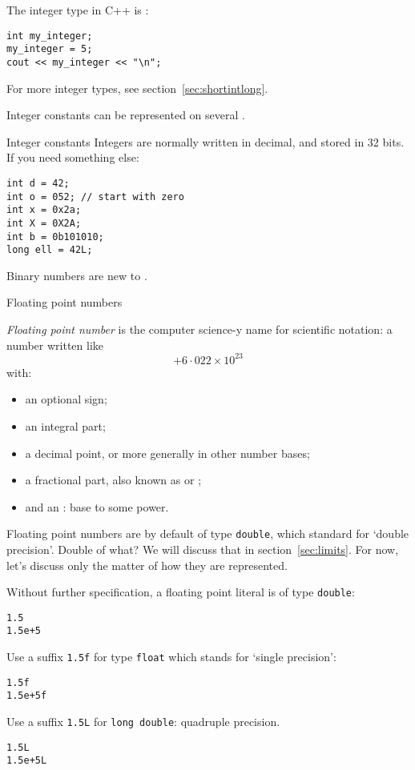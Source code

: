 The integer type in C++ is :
\begin{lstlisting}
int my_integer;
my_integer = 5;
cout << my_integer << "\n";
\end{lstlisting}

For more integer types, see section~\ref{sec:shortintlong}.

Integer constants can be represented on several .

\begin{block}{Integer constants}
  \label{sl:intvals}
  Integers are normally  written in decimal, and stored in 32 bits.
  If you need something else:
\begin{lstlisting}
int d = 42;
int o = 052; // start with zero
int x = 0x2a;
int X = 0X2A;
int b = 0b101010;
long ell = 42L;
\end{lstlisting}
\end{block}

Binary numbers are new to .

 {Floating point numbers}

\emph{Floating point number}
is the computer science-y name for scientific notation:
a number written like
\[ +6\cdot 022 \times 10^{23} \]
with:
\begin{itemize}
\item an optional sign;
\item an integral part;
\item a decimal point, or more generally 
  in other number bases;
\item a fractional part, also known as 
  or ;
\item and an : base to some power.
\end{itemize}

Floating point numbers are by default of type \lstinline{double},
which standard for `double precision'. Double of what?
We will discuss that in section~\ref{sec:limits}.
For now, let's discuss only the matter of how they are represented.

Without further specification, a floating point literal is of type \lstinline{double}:
\begin{lstlisting}
1.5
1.5e+5
\end{lstlisting}
Use a suffix  \lstinline{1.5f} for type \lstinline{float} which stands for `single precision':
\begin{lstlisting}
1.5f
1.5e+5f
\end{lstlisting}
Use a suffix  \lstinline{1.5L} for \lstinline{long double}: quadruple precision.
\begin{lstlisting}
1.5L
1.5e+5L
\end{lstlisting}

